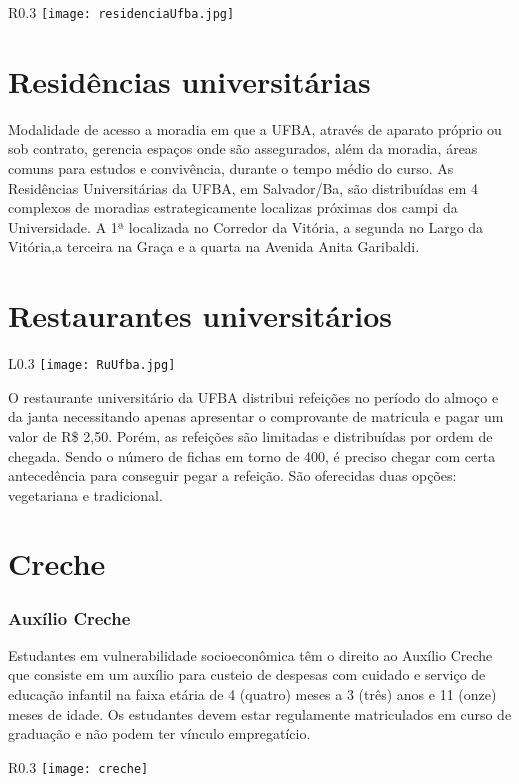         \begin{wrapfigure}{R}{0.3\textwidth}
            \centering
            \texttt{[image: residenciaUfba.jpg]}
        \end{wrapfigure}
\section{Residências universitárias}
         Modalidade de acesso a moradia em que a UFBA, através de aparato próprio ou sob contrato, gerencia espaços onde são assegurados, além da moradia, áreas comuns para estudos e convivência, durante o tempo médio do curso.
         As Residências Universitárias da UFBA, em Salvador/Ba, são distribuídas em 4 complexos de moradias estrategicamente localizas próximas dos campi da Universidade. A 1ª localizada no Corredor da Vitória, a segunda no Largo da Vitória,a terceira na Graça e a quarta na Avenida Anita Garibaldi.
         
 
\section{Restaurantes universitários}
    \begin{wrapfigure}{L}{0.3\textwidth}
            \centering
            \texttt{[image: RuUfba.jpg]}
        \end{wrapfigure}
    O restaurante universitário da UFBA distribui refeições no período do almoço e da janta necessitando apenas apresentar o comprovante de matricula e pagar um valor de R\$ 2,50. Porém, as refeições são limitadas e distribuídas por ordem de chegada. Sendo o número de fichas em torno de 400, é preciso chegar com certa antecedência para conseguir pegar a refeição. São oferecidas duas opções: vegetariana e tradicional.

\section{Creche}
    \subsubsection{Auxílio Creche}
        Estudantes em vulnerabilidade socioeconômica têm o direito ao Auxílio Creche que consiste em um auxílio para custeio de despesas com cuidado e serviço de educação infantil na faixa etária de 4 (quatro) meses a 3 (três) anos e 11 (onze) meses de idade.
        Os estudantes devem estar regulamente matriculados em curso de graduação e não podem ter vínculo empregatício.
        \begin{wrapfigure}{R}{0.3\textwidth}
            \centering
            \texttt{[image: creche]}
        \end{wrapfigure}

